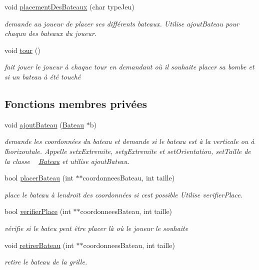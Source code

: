 \begin{DoxyCompactItemize}
void \mbox{\hyperlink{class_joueur_aa97f71a90328693e0047ba2f48d61b4b}{placement\+Des\+Bateaux}} (char type\+Jeu)
\begin{DoxyCompactList}\small\item\em demande au joueur de placer ses différents bateaux. Utilise ajout\+Bateau pour chaqun des bateaux du joueur. \end{DoxyCompactList}\item 
\mbox{\label{class_joueur_a46bdd92b73a1f0d04aeb5f19f33720b0}} 
void \mbox{\hyperlink{class_joueur_a46bdd92b73a1f0d04aeb5f19f33720b0}{tour}} ()
\begin{DoxyCompactList}\small\item\em fait jouer le joueur à chaque tour en demandant où il souhaite placer sa bombe et si un bateau à été touché \end{DoxyCompactList}\end{DoxyCompactItemize}
\subsection*{Fonctions membres privées}
\begin{DoxyCompactItemize}
\item 
void \mbox{\hyperlink{class_joueur_a063d68698a264c0b68d29d1c5249958c}{ajout\+Bateau}} (\mbox{\hyperlink{class_bateau}{Bateau}} $\ast$b)
\begin{DoxyCompactList}\small\item\em demande les coordonnées du bateau et demande si le bateau est à la verticale ou à l\textquotesingle{}horizontale. Appelle setx\+Extremite, sety\+Extremite et set\+Orientation, set\+Taille de la classe ~\newline
\mbox{\hyperlink{class_bateau}{Bateau}} et utilise ajout\+Bateau. \end{DoxyCompactList}\item 
bool \mbox{\hyperlink{class_joueur_ae39058e6dc3daab6fb0377ecda0dfb91}{placer\+Bateau}} (int $\ast$$\ast$coordonnees\+Bateau, int taille)
\begin{DoxyCompactList}\small\item\em place le bateau à l\textquotesingle{}endroit des coordonnées si c\textquotesingle{}est possible Utilise verifier\+Place. \end{DoxyCompactList}\item 
bool \mbox{\hyperlink{class_joueur_a59dba014d589c53de17a5158989f1a0a}{verifier\+Place}} (int $\ast$$\ast$coordonnees\+Bateau, int taille)
\begin{DoxyCompactList}\small\item\em vérifie si le bateu peut être placer là où le joueur le souhaite \end{DoxyCompactList}\item 
void \mbox{\hyperlink{class_joueur_acb9b4b6a2cbf4068ac456e7aba786caf}{retirer\+Bateau}} (int $\ast$$\ast$coordonnees\+Bateau, int taille)
\begin{DoxyCompactList}\small\item\em retire le bateau de la grille. \end{DoxyCompactList}\end{DoxyCompactItemize}

